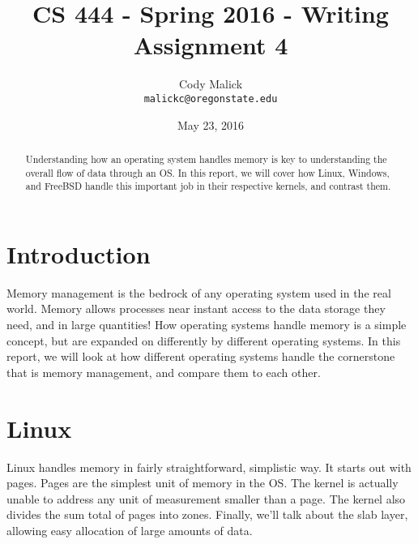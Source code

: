 

% 
  \begin{titlepage}
    \title{CS 444 - Spring 2016 - Writing Assignment 4}
    \author{Cody Malick\\
    \texttt{malickc@oregonstate.edu}}
    \date{May 23, 2016}
    \maketitle
    \vspace{4cm}
    \begin{abstract}
      \noindent Understanding how an operating system handles memory is key
      to understanding the overall flow of data through an OS. In this report,
      we will cover how Linux, Windows, and FreeBSD handle this important job
      in their respective kernels, and contrast them.
    \end{abstract}
  \end{titlepage}

  \tableofcontents
  \clearpage
  \section{Introduction}
  Memory management is the bedrock of any operating system used in the real
  world. Memory allows processes near instant access to the data storage they
  need, and in large quantities! How operating systems handle memory is a simple
  concept, but are expanded on differently by different operating systems. In
  this report, we will look at how different operating systems handle the
  cornerstone that is memory management, and compare them to each other.

  \section{Linux}
	Linux handles memory in fairly straightforward, simplistic way. It
	starts out with pages. Pages are the simplest unit of memory in the OS.
	The kernel is actually unable to address any unit of measurement smaller
	than a page. The kernel also divides the sum total of pages into zones.
	Finally, we'll talk about the slab layer, allowing easy allocation of
	large amounts of data.
